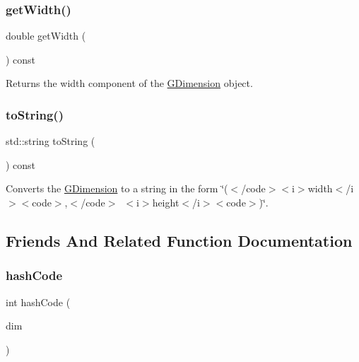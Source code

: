 \mbox{\label{classGDimension_a0ed2965abd4f5701d2cadf71239faf19}} 
\subsubsection{\texorpdfstring{get\+Width()}{getWidth()}}
{\footnotesize\ttfamily double get\+Width (\begin{DoxyParamCaption}{ }\end{DoxyParamCaption}) const}



Returns the width component of the {\ttfamily \mbox{\hyperlink{classGDimension}{G\+Dimension}}} object. 

\mbox{\label{classGDimension_a1fe5121d6528fdea3f243321b3fa3a49}} 
\subsubsection{\texorpdfstring{to\+String()}{toString()}}
{\footnotesize\ttfamily std\+::string to\+String (\begin{DoxyParamCaption}{ }\end{DoxyParamCaption}) const}



Converts the {\ttfamily \mbox{\hyperlink{classGDimension}{G\+Dimension}}} to a string in the form {\ttfamily \char`\"{}($<$/code$>$$<$i$>$width$<$/i$>$$<$code$>$,$<$/code$>$~$<$i$>$height$<$/i$>$$<$code$>$)\char`\"{}}. 



\subsection{Friends And Related Function Documentation}
\mbox{\label{classGDimension_a234b578e512fa99a9f3a829f5e461454}} 
\subsubsection{\texorpdfstring{hash\+Code}{hashCode}}
{\footnotesize\ttfamily int hash\+Code (\begin{DoxyParamCaption}\item[{const \mbox{\hyperlink{classGDimension}{G\+Dimension}} \&}]{dim }\end{DoxyParamCaption})\hspace{0.3cm}{\ttfamily [friend]}}



